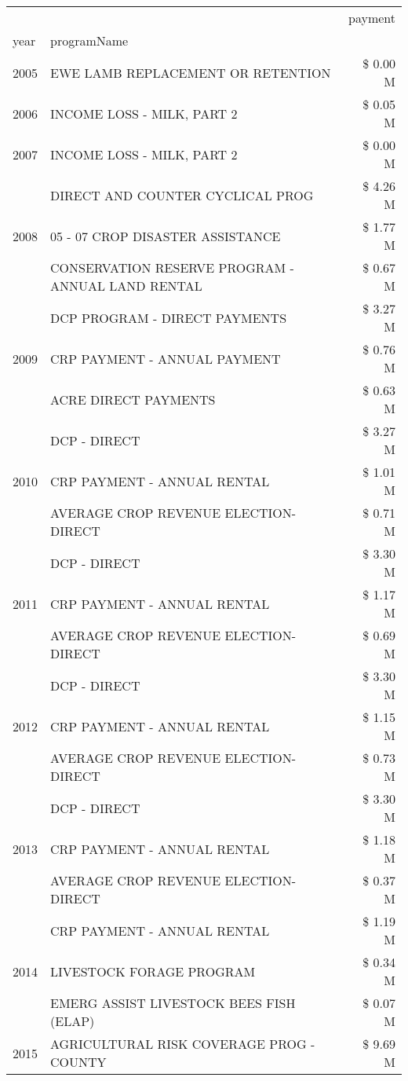 \begin{tabular}{llr}
\toprule
 &  & payment \\
year & programName &  \\
\midrule
2005 & EWE LAMB REPLACEMENT OR RETENTION & \$ 0.00 M \\
\cline{1-3}
2006 & INCOME LOSS - MILK, PART 2 & \$ 0.05 M \\
\cline{1-3}
2007 & INCOME LOSS - MILK, PART 2 & \$ 0.00 M \\
\cline{1-3}
\multirow[t]{3}{*}{2008} & DIRECT AND COUNTER CYCLICAL PROG & \$ 4.26 M \\
 & 05 - 07 CROP DISASTER ASSISTANCE & \$ 1.77 M \\
 & CONSERVATION RESERVE PROGRAM - ANNUAL LAND RENTAL & \$ 0.67 M \\
\cline{1-3}
\multirow[t]{3}{*}{2009} & DCP PROGRAM - DIRECT PAYMENTS & \$ 3.27 M \\
 & CRP PAYMENT - ANNUAL PAYMENT & \$ 0.76 M \\
 & ACRE DIRECT PAYMENTS & \$ 0.63 M \\
\cline{1-3}
\multirow[t]{3}{*}{2010} & DCP - DIRECT & \$ 3.27 M \\
 & CRP PAYMENT - ANNUAL RENTAL & \$ 1.01 M \\
 & AVERAGE CROP REVENUE ELECTION-DIRECT & \$ 0.71 M \\
\cline{1-3}
\multirow[t]{3}{*}{2011} & DCP - DIRECT & \$ 3.30 M \\
 & CRP PAYMENT - ANNUAL RENTAL & \$ 1.17 M \\
 & AVERAGE CROP REVENUE ELECTION-DIRECT & \$ 0.69 M \\
\cline{1-3}
\multirow[t]{3}{*}{2012} & DCP - DIRECT & \$ 3.30 M \\
 & CRP PAYMENT - ANNUAL RENTAL & \$ 1.15 M \\
 & AVERAGE CROP REVENUE ELECTION-DIRECT & \$ 0.73 M \\
\cline{1-3}
\multirow[t]{3}{*}{2013} & DCP - DIRECT & \$ 3.30 M \\
 & CRP PAYMENT - ANNUAL RENTAL & \$ 1.18 M \\
 & AVERAGE CROP REVENUE ELECTION-DIRECT & \$ 0.37 M \\
\cline{1-3}
\multirow[t]{3}{*}{2014} & CRP PAYMENT - ANNUAL RENTAL & \$ 1.19 M \\
 & LIVESTOCK FORAGE PROGRAM & \$ 0.34 M \\
 & EMERG ASSIST LIVESTOCK BEES FISH (ELAP) & \$ 0.07 M \\
\cline{1-3}
\multirow[t]{3}{*}{2015} & AGRICULTURAL RISK COVERAGE PROG - COUNTY & \$ 9.69 M \\

\end{tabular}
